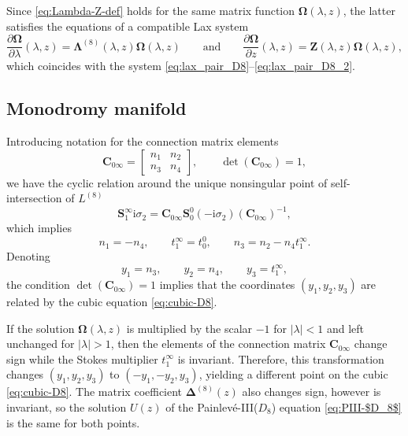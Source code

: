 \documentclass[11pt]{article}
\numberwithin{equation}{section}
\numberwithin{equation}{section}
\newcommand{\ii}{\mathrm{i}}
\begin{document}
Since \eqref{eq:Lambda-Z-def} holds for the same matrix function $\mathbf{\Omega}(\lambda,z)$, the latter satisfies the equations of a compatible Lax system
\begin{equation}
 \frac{\partial\mathbf{\Omega}}{\partial\lambda}(\lambda,z)=\mathbf{\Lambda}^{(8)}(\lambda,z)\mathbf{\Omega}(\lambda,z)\qquad\text{and}\qquad\frac{\partial\mathbf{\Omega}}{\partial z}(\lambda,z)=\mathbf{Z}(\lambda,z)\mathbf{\Omega}(\lambda,z),
\label{eq:Lax-system}
\end{equation}
which coincides with the system \eqref{eq:lax_pair_D8}--\eqref{eq:lax_pair_D8_2}.

\subsection{Monodromy manifold}
\label{sec:monodromy-rep-$D_8$-manifold}
Introducing notation for the connection matrix elements
\begin{equation*}
 \mathbf{C}_{0\infty}=\begin{bmatrix}
 n_1&n_2\\n_3&n_4
 \end{bmatrix},\qquad \det(\mathbf{C}_{0\infty})=1,
\end{equation*}
we have the cyclic relation around the unique nonsingular point of self-intersection of $L^{(8)}$
 \begin{equation*}%
\mathbf{S}^\infty_{{1}}\ii\sigma_2= \mathbf{C}_{0\infty}\mathbf{S}^0_{{0}}(-\ii\sigma_2)(\mathbf{C}_{0\infty})^{-1},
\end{equation*}
which implies
\[
n_1=-n_4,\qquad t_1^{\infty}=t_{0}^0,\qquad n_3=n_2-n_4t_1^{\infty}.
\]
Denoting
\[
y_1=n_3,\qquad y_2=n_4,\qquad y_3=t_1^{\infty},
\]
the condition $\det(\mathbf{C}_{0\infty})=1$ implies that the coordinates $(y_1,y_2,y_3)$ are related by the cubic equation \eqref{eq:cubic-D8}.

\begin{Remark}
 If the solution $\mathbf{\Omega}(\lambda,z)$ is multiplied by the scalar $-1$ for $|\lambda|<1$ and left unchanged for $|\lambda|>1$, then the elements of the connection matrix $\mathbf{C}_{0\infty}$ change sign while the Stokes multiplier $t_1^\infty$ is invariant. Therefore, this transformation changes $(y_1,y_2,y_3)$ to $(-y_1,-y_2,y_3)$, yielding a different point on the cubic \eqref{eq:cubic-D8}. The matrix coefficient $\mathbf{\Delta}^{(8)}(z)$ also changes sign, however  is invariant, so the solution $U(z)$ of the Painlev\'e-III($D_8$) equation \eqref{eq:PIII-$D_8$} is the same for both points.
 \label{rem:minus-y1-y2}
\end{Remark}
\end{document}
